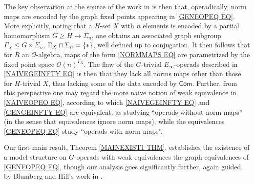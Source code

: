 \documentclass[a4paper,10pt
,draft
]{article}%
\numberwithin{equation}{section}
\numberwithin{figure}{section}
\theoremstyle{definition} %
\newcommand{\1}{\ensuremath{\mathbbm 1}}%
\begin{document}
The key observation at the source of the work in 
\cite{BH15} is then that, operadically, 
norm maps are encoded by the graph fixed points 
appearing in \eqref{GENEOPEQ EQ}.
More explicitly, noting that a $H$-set $X$ with $n$ elements 
is encoded by a partial homomorphism 
$G \geq H \to \Sigma_n$, 
one obtains an associated graph subgroup 
$\Gamma_X \leq G \times \Sigma_n$,
$\Gamma_X \cap \Sigma_n =\{\**\}$, well defined up to conjugation. It then follows that for $R$ an 
$\mathcal{O}$-algebra, maps of the form \eqref{NORMMAPS EQ}
are parametrized by the fixed point space
$\mathcal{O}(n)^{\Gamma_X}$.
The flaw of the $G$-trivial $E_{\infty}$-operads
described in \eqref{NAIVEGEINFTY EQ} is then that they lack all norms maps other than those for $H$-trivial $X$, thus lacking 
some of the data encoded by $\mathsf{Com}$.
Further, from this perspective one may regard the more naive notion of weak equivalence in \eqref{NAIVEOPEQ EQ},
according to which \eqref{NAIVEGEINFTY EQ} and \eqref{GENGEINFTY EQ} are equivalent,
as studying ``operads without norm maps''
(in the sense that equivalences ignore norm maps), 
while the equivalences \eqref{GENEOPEQ EQ}
study ``operads with norm maps''.

Our first main result, Theorem \ref{MAINEXIST1 THM}, 
establishes the existence of a model structure on $G$-operads with weak equivalences the graph equivalences of \eqref{GENEOPEQ EQ},
though our analysis goes significantly further, again guided by Blumberg and Hill's work in \cite{BH15}.
\end{document}
